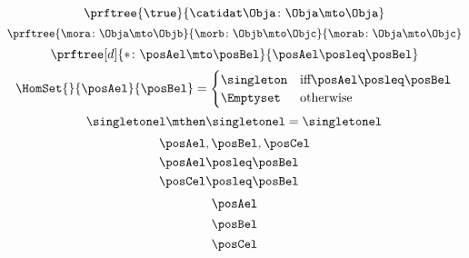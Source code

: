 {\begin{forslides}
\begin{equation}
        \end{equation}
        \begin{equation}
            \label{eq:id_ex}
            \prftree{\true}{\catidat\Obja\colon \Obja \mto \Obja}
        \end{equation}
        \begin{equation}
            \label{eq:comp_cat}
            \prftree{\mora \colon \Obja \mto \Objb}{\morb\colon \Objb \mto \Objc}{\morab \colon \Obja \mto \Objc}
        \end{equation}
        \begin{equation}
            \label{eq:mor_pre}
            \prftree[d]{\ast\colon \posAel \mto \posBel}{\posAel \posleq \posBel}
        \end{equation}
        \begin{equation}
            \label{eq:hom_pre}
            \HomSet{}{\posAel}{\posBel}=\begin{cases}
                \singleton & \text{iff} \posAel \posleq \posBel \\
                \Emptyset  & \text{otherwise}
            \end{cases}
        \end{equation}
        \begin{equation}
            \label{eq:comp_pre}
            \singletonel \mthen \singletonel = \singletonel
        \end{equation}
        \begin{equation}
            \label{eq:ex_pre}
            \begin{aligned}
                 & \posAel,\posBel,\posCel \\
                 & \posAel \posleq \posBel \\
                 & \posCel \posleq \posBel
            \end{aligned}
        \end{equation}
        \begin{equation}
            \label{eq:pre_p}
            \posAel
        \end{equation}
        \begin{equation}
            \label{eq:pre_q}
            \posBel
        \end{equation}
        \begin{equation}
            \label{eq:pre_r}
            \posCel
        \end{equation}
        \begin{equation}
            \label{eq:eq_rel}

\end{equation}
\end{forslides}}
